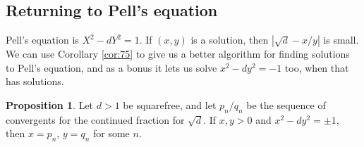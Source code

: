 \documentclass{article}
\newcommand{\rb}[1]{\left( #1 \right)}
\newcommand{\abs}[1]{\left\lvert #1 \right\rvert}
\theoremstyle{definition}\newtheorem{definition}{Definition}
\theoremstyle{definition}\newtheorem{remark}[definition]{Remark}
\theoremstyle{definition}\newtheorem*{example}{Example}
\theoremstyle{definition}\newtheorem*{note}{Note}
\newtheorem{proposition}[definition]{Proposition}
\begin{document}

\subsection{Returning to Pell's equation}

Pell's equation is $ X^2 - dY^2 = 1 $. If $ \rb{x, y} $ is a solution, then $ \abs{\sqrt{d} - x / y} $ is small. We can use Corollary \ref{cor:75} to give us a better algorithm for finding solutions to Pell's equation, and as a bonus it lets us solve $ x^2 - dy^2 = -1 $ too, when that has solutions.

\begin{proposition}
Let $ d > 1 $ be squarefree, and let $ p_n / q_n $ be the sequence of convergents for the continued fraction for $ \sqrt{d} $. If $ x, y > 0 $ and $ x^2 - dy^2 = \pm 1 $, then $ x = p_n $, $ y = q_n $ for some $ n $.
\end{proposition}
\end{document}
